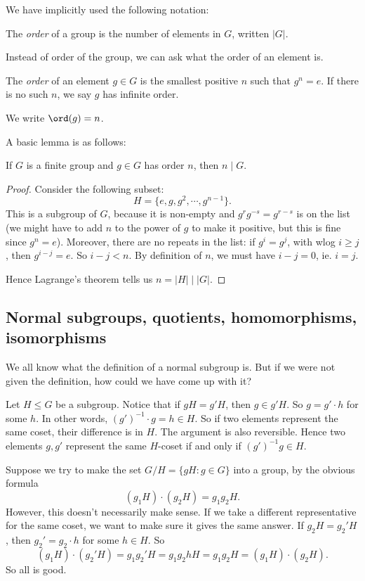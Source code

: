 \documentclass[a4paper]{article}
\begin{document}
We have implicitly used the following notation:
\begin{defi}
  The \emph{order} of a group is the number of elements in $G$, written $|G|$.
\end{defi}

Instead of order of the group, we can ask what the order of an element is.
\begin{defi}
  The \emph{order} of an element $g \in G$ is the smallest positive $n$ such that $g^n = e$. If there is no such $n$, we say $g$ has infinite order.

  We write $\ord(g) = n$.
\end{defi}

A basic lemma is as follows:
\begin{lemma}
  If $G$ is a finite group and $g \in G$ has order $n$, then $n \mid G$.
\end{lemma}

\begin{proof}
  Consider the following subset:
  \[
    H= \{e, g, g^2, \cdots, g^{n - 1}\}.
  \]
  This is a subgroup of $G$, because it is non-empty and $g^rg^{-s} = g^{r - s}$ is on the list (we might have to add $n$ to the power of $g$ to make it positive, but this is fine since $g^n = e$). Moreover, there are no repeats in the list: if $g^i = g^j$, with wlog $i \geq j$, then $g^{i - j} = e$. So $i - j < n$. By definition of $n$, we must have $i - j = 0$, ie. $i = j$.

  Hence Lagrange's theorem tells us $n = |H| \mid |G|$.
\end{proof}

\subsection{Normal subgroups, quotients, homomorphisms, isomorphisms}
We all know what the definition of a normal subgroup is. But if we were not given the definition, how could we have come up with it?

Let $H \leq G$ be a subgroup. Notice that if $gH = g'H$, then $g \in g'H$. So $g = g'\cdot h$ for some $h$. In other words, $(g')^{-1} \cdot g = h \in H$. So if two elements represent the same coset, their difference is in $H$. The argument is also reversible. Hence two elements $g, g'$ represent the same $H$-coset if and only if $(g')^{-1} g \in H$.

Suppose we try to make the set $G/H = \{gH: g \in G\}$ into a group, by the obvious formula
\[
  (g_1 H) \cdot (g_2 H) = g_1 g_2 H.
\]
However, this doesn't necessarily make sense. If we take a different representative for the same coset, we want to make sure it gives the same answer. If $g_2 H = g_2' H$, then $g_2' = g_2 \cdot h$ for some $h \in H$. So
\[
  (g_1 H) \cdot (g_2' H) = g_1 g_2' H = g_1 g_2 h H = g_1g_2 H = (g_1 H) \cdot (g_2 H).
\]
So all is good.
\end{document}
